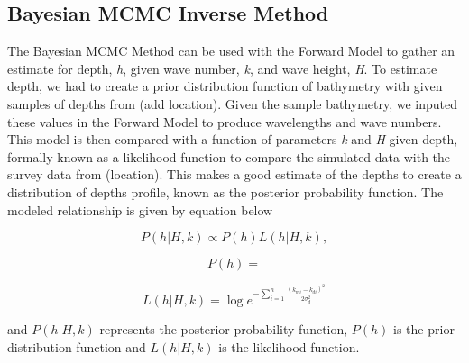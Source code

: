 \subsection{Bayesian MCMC Inverse Method}

The Bayesian MCMC Method can be used with the Forward Model to gather an estimate for depth, \textit{h}, given wave number, \textit{k}, and wave height, \textit{H}. To estimate depth, we had to create a prior distribution function of bathymetry with given samples of depths from (add location).  Given the sample bathymetry, we inputed these values in the Forward Model to produce wavelengths and wave numbers. This model is then compared with a function of parameters \textit{k} and \textit{H} given depth, formally known as a likelihood function to compare the simulated data with the survey data from (location). This makes a good estimate of the depths to create a distribution of depths profile, known as the posterior probability function.  The modeled relationship is given by equation below


$$P(h|H,k) \propto P(h)L(h|H,k),$$ 

$$P(h)=$$

\[ L(h|H,k)=\log{e^{-\sum\limits_{i=1}^n \frac{({k}_{mi}-k_{di})^2}{2\sigma_{d}^2}}}\]


and $P(h|H,k)$ represents the posterior probability function, $P(h)$ is the prior distribution function and $L(h|H,k)$ is the likelihood function.






